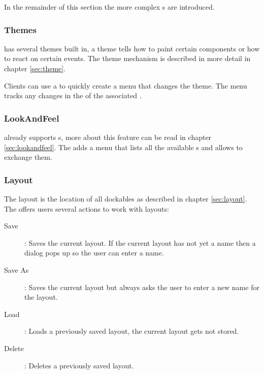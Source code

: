 In the remainder of this section the more complex s are introduced.

\subsubsection{Themes}
 has several themes built in, a theme tells how to paint certain components or how to react on certain events. The theme mechanism is described in more detail in chapter \ref{sec:theme}.

Clients can use a  to quickly create a menu that changes the theme. The menu tracks any changes in the  of the associated .


\subsubsection{LookAndFeel} \label{sec:menu:lookandfeel}
 already supports s, more about this feature can be read in chapter \ref{sec:lookandfeel}. The  adds a menu that lists all the available s and allows to exchange them.



\subsubsection{Layout}
The layout is the location of all dockables as described in chapter \ref{sec:layout}. The  offers users several actions to work with layouts:
\begin{description}
 \item [Save]: Saves the current layout. If the current layout has not yet a name then a dialog pops up so the user can enter a name.
 \item [Save As]: Saves the current layout but always asks the user to enter a new name for the layout.
 \item [Load]: Loads a previously saved layout, the current layout gets not stored.
 \item [Delete]: Deletes a previously saved layout.
\end{description}

